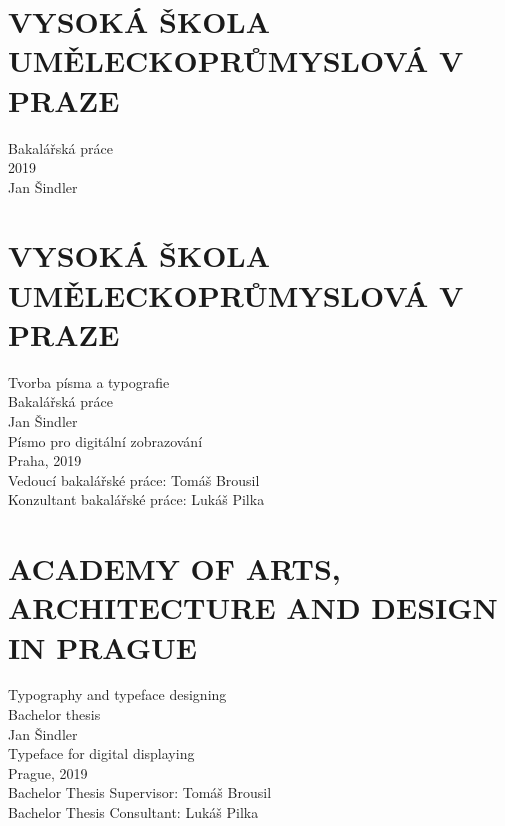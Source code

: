 \documentclass[a4paper]{article}
\begin{document}
\section*{VYSOKÁ ŠKOLA\\UMĚLECKOPRŮMYSLOVÁ V PRAZE}
\thispagestyle{empty}
Bakalářská práce\\
\vfill
2019\\
Jan Šindler

\section*{VYSOKÁ ŠKOLA\\UMĚLECKOPRŮMYSLOVÁ V PRAZE}
\thispagestyle{empty}
Tvorba písma a typografie\\
Bakalářská práce\\
Jan Šindler\\
\vspace{20mm}
Písmo pro digitální zobrazování\\
\vfill
Praha, 2019\\
Vedoucí bakalářské práce: Tomáš Brousil\\
Konzultant bakalářské práce: Lukáš Pilka\\

\section*{ACADEMY OF ARTS, ARCHITECTURE AND DESIGN IN PRAGUE}
\thispagestyle{empty}
Typography and typeface designing\\
Bachelor thesis\\
Jan Šindler\\
\vspace{20mm}
Typeface for digital displaying\\
\vfill
Prague, 2019\\
Bachelor Thesis Supervisor: Tomáš Brousil\\
Bachelor Thesis Consultant: Lukáš Pilka\\
\end{document}
